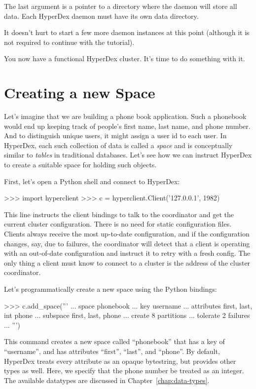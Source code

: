 The last argument is a pointer to a directory where the daemon will store all
data.  Each HyperDex daemon must have its own data directory.

It doesn't hurt to start a few more daemon instances at this point (although it
is not required to continue with the tutorial).

You now have a functional HyperDex cluster.  It's time to do something with it.

\section{Creating a new Space}

Let's imagine that we are building a phone book application.  Such a phonebook
would end up keeping track of people's first name, last name, and phone number.
And to distinguish unique users, it might assign a user id to each user.  In
HyperDex, each such collection of data is called a {\em space} and is
conceptually similar to {\em tables} in traditional databases.  Let's see how we
can instruct HyperDex to create a suitable space for holding such objects.

First, let's open a Python shell and connect to HyperDex:

\begin{pythoncode}
>>> import hyperclient
>>> c = hyperclient.Client('127.0.0.1', 1982)
\end{pythoncode}

This line instructs the client bindings to talk to the coordinator and get the
current cluster configuration.  There is no need for static configuration files.
Clients always receive the most up-to-date configuration, and if the
configuration changes, say, due to failures, the coordinator will detect that a
client is operating with an out-of-date configuration and instruct it to retry
with a fresh config.  The only thing a client must know to connect to a cluster
is the address of the cluster coordinator.

Let's programmatically create a new space using the Python bindings:

\begin{pythoncode}
>>> c.add_space('''
... space phonebook
... key username
... attributes first, last, int phone
... subspace first, last, phone
... create 8 partitions
... tolerate 2 failures
... ''')
\end{pythoncode}

This command creates a new space called ``phonebook'' that has a key of
``username'', and has attributes ``first'', ``last'', and ``phone''.  By
default, HyperDex treats every attribute as an opaque bytestring, but provides
other types as well.  Here, we specify that the phone number be treated as an
integer.  The available datatypes are discussed in
Chapter~\ref{chap:data-types}.

